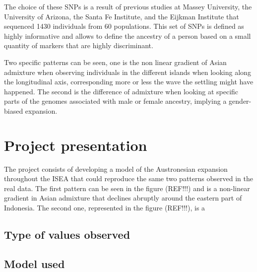 \documentclass[a4paper,12pt]{report}
\begin{document}
The choice of these SNPs is a result of previous studies at Massey University, the University of Arizona, the Santa Fe Institute, and the Eijkman Institute that sequenced 1430 individuals from 60 populations. This set of SNPs is defined as highly informative and allows to define the ancestry of a person based on a small quantity of markers that are highly discriminant.

Two specific patterns can be seen, one is the non linear gradient of Asian admixture when observing individuals in the different islands when looking along the longitudinal axis, corresponding more or less the wave the settling might have happened. The second is the difference of admixture when looking at specific parts of the genomes associated with male or female ancestry, implying a gender-biased expansion.


\chapter{Project presentation}
The project consists of developing a model of the Austronesian expansion throughout the ISEA that could reproduce the same two patterns observed in the real data.
The first pattern can be seen in the figure (REF!!!) and is a non-linear gradient in Asian admixture that declines abruptly around the eastern part of Indonesia. The second one, represented in the figure (REF!!!), is a 

\section{Type of values observed}

\section{Model used}
\end{document}
